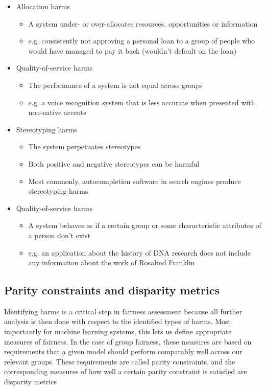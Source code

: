 \begin{itemize}
    \item Allocation harms
    \begin{itemize}
        \item A system under- or over-allocates resources, opportunities or information
        \item e.g. consistently not approving a personal loan to a group of people who would have managed to pay it back (wouldn't default on the loan)
    \end{itemize}
    \item Quality-of-service harms
    \begin{itemize}
        \item The performance of a system is not equal across groups
        \item e.g. a voice recognition system that is less accurate when presented with non-native accents
    \end{itemize}
    \item Stereotyping harms
    \begin{itemize}
        \item The system perpetuates stereotypes
        \item Both positive and negative stereotypes can be harmful
        \item Most commonly, autocompletion software in search engines produce stereotyping harms
    \end{itemize}
    \item Quality-of-service harms
    \begin{itemize}
        \item A system behaves as if a certain group or some characteristic attributes of a person don't exist
        \item e.g. an application about the history of DNA research does not include any information about the work of Rosalind Franklin
    \end{itemize}
\end{itemize}

\subsection{Parity constraints and disparity metrics}

Identifying harms is a critical step in fairness assessment because all further analysis is then done with respect to the identified types of harms. Most importantly for machine learning systems, this lets us define appropriate measures of fairness. In the case of group fairness, these measures are based on requirements that a given model should perform comparably well across our relevant groups. These requirements are called parity constraints, and the corresponding measures of how well a certain parity constraint is satisfied are disparity metrics \cite{fairlearn}. 

